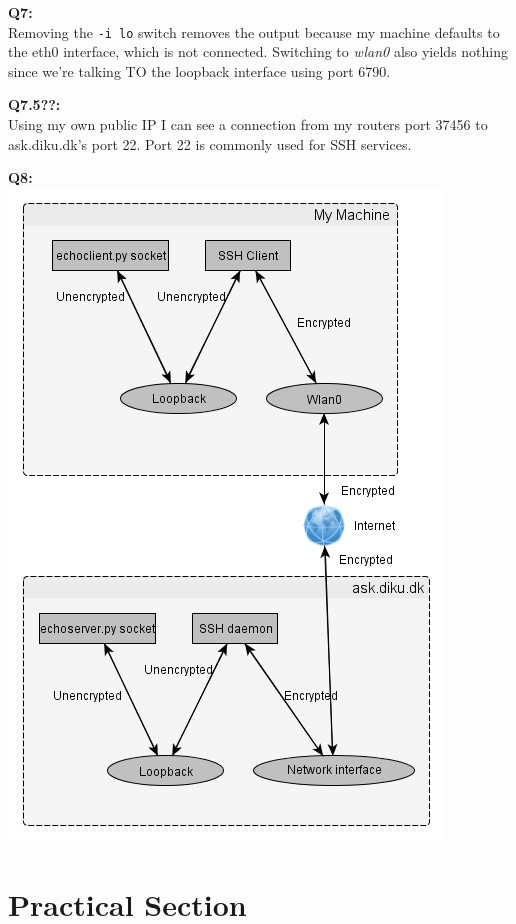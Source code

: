 \documentclass[10pt]{article}
\begin{document}
\noindent \textbf{Q7:}\\
Removing the \texttt{-i lo} switch removes the output because my machine
defaults to the eth0 interface, which is not connected. Switching to
\textit{wlan0} also yields nothing since we're talking TO the loopback interface
using port 6790.

\noindent \textbf{Q7.5??:}\\
Using my own public IP I can see a connection from my routers port 37456 to
ask.diku.dk's port 22. Port 22 is commonly used for SSH services.

\noindent \textbf{Q8:}\\
\includegraphics[width=\textwidth]{q8.png}


\section{Practical Section}
\end{document}
